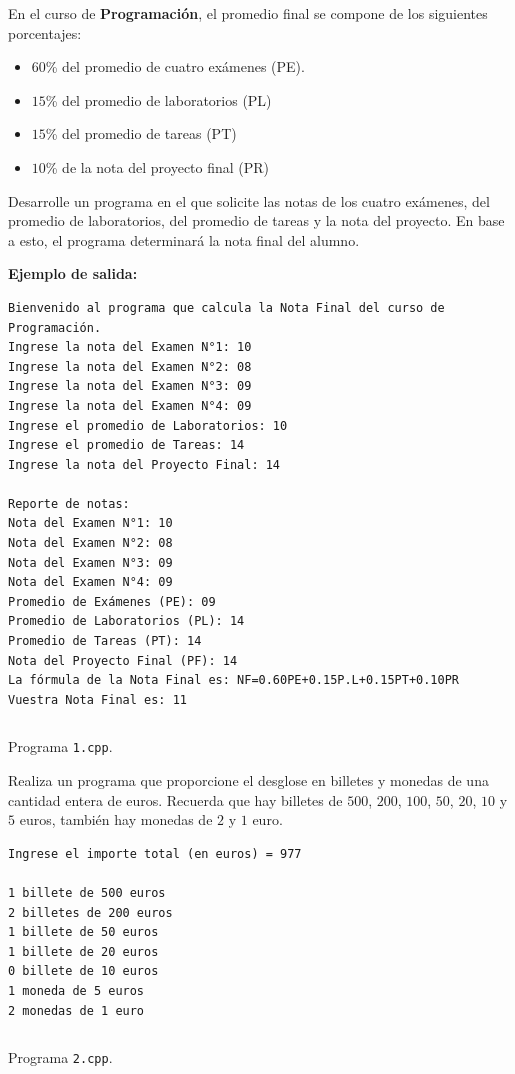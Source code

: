 \documentclass[spanish,addpoints,answers,a4paper]{exam}
\begin{document}
\begin{questions}

\question En el curso de \textbf{Programación}, el promedio final se compone de los siguientes porcentajes:

\begin{itemize}[--]
	\item $60$\% del promedio de cuatro exámenes (PE).
	\item $15$\% del promedio de laboratorios (PL)
	\item $15$\% del promedio de tareas (PT)
	\item $10$\% de la nota del proyecto final (PR)
\end{itemize}

Desarrolle un programa en el que solicite las notas de los cuatro exámenes, del promedio de laboratorios, del promedio de tareas y la nota del proyecto. En base a esto, el programa determinará la nota final del alumno.

\textbf{Ejemplo de salida:}
\begin{verbatim}
Bienvenido al programa que calcula la Nota Final del curso de Programación.
Ingrese la nota del Examen N°1: 10
Ingrese la nota del Examen N°2: 08
Ingrese la nota del Examen N°3: 09
Ingrese la nota del Examen N°4: 09
Ingrese el promedio de Laboratorios: 10
Ingrese el promedio de Tareas: 14
Ingrese la nota del Proyecto Final: 14

Reporte de notas:
Nota del Examen N°1: 10
Nota del Examen N°2: 08
Nota del Examen N°3: 09
Nota del Examen N°4: 09
Promedio de Exámenes (PE): 09
Promedio de Laboratorios (PL): 14
Promedio de Tareas (PT): 14
Nota del Proyecto Final (PF): 14
La fórmula de la Nota Final es: NF=0.60PE+0.15P.L+0.15PT+0.10PR
Vuestra Nota Final es: 11
\end{verbatim}

\begin{solution}
	\begin{listing}[H]
		\footnotesize
		\inputminted{cpp}{1.cpp}
		\caption{Programa \texttt{1.cpp}.}
		\label{lst:1.9}
\end{listing}
\end{solution}

\question Realiza un programa que proporcione el desglose en billetes y monedas de una cantidad entera de euros. Recuerda que hay billetes de $500$, $200$, $100$, $50$, $20$, $10$ y $5$ euros, también hay monedas de $2$ y $1$ euro.

\begin{verbatim}
Ingrese el importe total (en euros) = 977

1 billete de 500 euros
2 billetes de 200 euros
1 billete de 50 euros
1 billete de 20 euros
0 billete de 10 euros
1 moneda de 5 euros
2 monedas de 1 euro
\end{verbatim}

\begin{solution}
	\begin{listing}[H]
		\footnotesize
		\inputminted{cpp}{2.cpp}
		\caption{Programa \texttt{2.cpp}.}
		\label{lst:1.10}
\end{listing}
\end{solution}

\end{questions}
\end{document}
